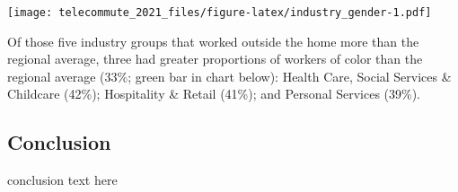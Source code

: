 \documentclass[
  12pt,
]{article}
\begin{document}
\texttt{[image: telecommute\_2021\_files/figure-latex/industry\_gender-1.pdf]}

\begin{flushleft}
Of those five industry groups that worked outside the home more than the regional average, three had greater proportions of workers of color than the regional average (33\%; green bar in chart below): Health Care, Social Services & Childcare (42\%); Hospitality & Retail (41\%); and Personal Services (39\%).
\end{flushleft}

\subsection{Conclusion}
\begin{flushleft}

conclusion text here

\end{flushleft}
\end{document}
